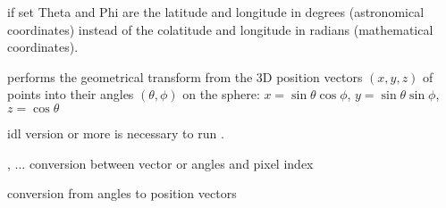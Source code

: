 \begin{keywords}
  \begin{kwlist}{} %
    \item[ASTRO\mytarget{idl:vec2ang:ASTRO}%
 =] if set Theta and Phi are the latitude and longitude in
    degrees (astronomical coordinates) instead of the colatitude and longitude
    in radians (mathematical coordinates).
  \end{kwlist}
\end{keywords}  

\begin{codedescription}
{\facname performs the geometrical transform from the 3D position vectors
$(x,y,z)$ of
points 
into their angles $(\theta,\phi)$ on the sphere:
$x = \sin\theta\cos\phi$, $y=\sin\theta\sin\phi$, $z=\cos\theta$}
\end{codedescription}



\begin{related}
  \begin{sulist}{} %
    \item[idl] version \idlversion or more is necessary to run \facname.	
    \item[\htmlref{pix2xxx}{idl:pix_tools}, ... ] conversion between vector or angles and pixel index
    \item[\htmlref{ang2vec}{idl:ang2vec}] conversion from angles to position vectors
  \end{sulist}
\end{related}

\begin{example}
{
\begin{tabular}{ll} %
\end{tabular}
}
{
}
\end{example}

